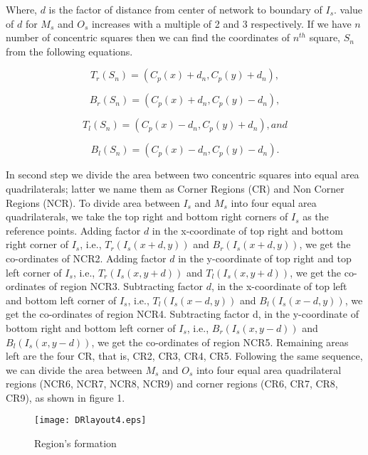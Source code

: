 \documentclass[3p,times,procedia]{elsarticle}
\begin{document}
Where, $d$ is the factor of distance from center of network to boundary of $I_s$. value of $d$ for $M_s$ and $O_s$ increases with a multiple of 2 and 3 respectively. If we have $n$ number of concentric squares then we can find the coordinates of $n^{th}$ square, $S_n$ from the following equations. 

\begin{equation}
T_r(S_n) = (C_p(x) + d_n , C_p(y) + d_n),  \end{equation}

\begin{equation}
B_r(S_n) = (C_p(x) + d_n , C_p(y) - d_n),  \end{equation}

\begin{equation}
T_l(S_n) = (C_p(x) - d_n , C_p(y) + d_n), and  \end{equation}

\begin{equation}
B_l(S_n) = (C_p(x) - d_n , C_p(y) - d_n).  \end{equation}

In second step we divide the area between two concentric squares into equal area quadrilaterals; latter we name them as Corner  Regions (CR) and Non Corner  Regions (NCR). To divide area between $I_s$ and $M_s$ into four equal area quadrilaterals, we take the top right and bottom right corners of $I_s$ as the reference points. Adding factor $d$ in the x-coordinate of top right and bottom right corner of $I_s$, i.e., $T_r(I_s(x+d, y))$ and $B_r(I_s(x+d, y))$, we get the co-ordinates of NCR2. Adding factor $d$ in the y-coordinate of top right and top left corner of $I_s$, i.e., $T_r(I_s(x, y+d))$ and $T_l(I_s(x, y+d))$, we get the co-ordinates of region NCR3. Subtracting factor $d$, in the x-coordinate of top left and bottom left corner of $I_s$, i.e., $T_l(I_s(x-d, y))$ and $B_l(I_s(x-d, y))$, we get the co-ordinates of region NCR4. Subtracting factor d, in the y-coordinate of bottom right and bottom left corner of $I_s$, i.e., $B_r(I_s(x, y-d))$ and $B_l(I_s(x, y-d))$, we get the co-ordinates of region NCR5. Remaining areas left are the four CR, that is, CR2, CR3, CR4, CR5.
Following the same sequence,  we can divide the area between $M_s$ and $O_s$ into four equal area quadrilateral regions (NCR6, NCR7, NCR8, NCR9)  and corner regions (CR6, CR7, CR8, CR9), as shown in figure 1.

\begin{figure*}[ht!]       \centering
\texttt{[image: DRlayout4.eps]}
\caption{Region's formation}
\label{DRlayout4}
\end{figure*}
\end{document}
